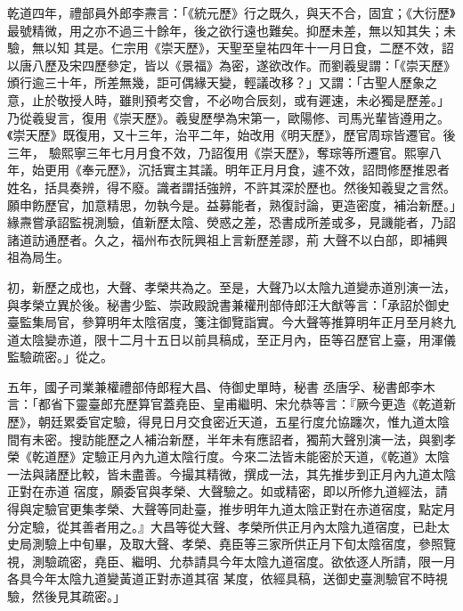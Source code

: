 
\begin{pinyinscope}

 乾道四年，禮部員外郎李燾言：「《統元歷》行之既久，與天不合，固宜；《大衍歷》最號精微，用之亦不過三十餘年，後之欲行遠也難矣。抑歷未差，無以知其失；未驗，無以知
 其是。仁宗用《崇天歷》，天聖至皇祐四年十一月日食，二歷不效，詔以唐八歷及宋四歷參定，皆以《景福》為密，遂欲改作。而劉羲叟謂：「《崇天歷》頒行逾三十年，所差無幾，詎可偶緣天變，輕議改移？」又謂：「古聖人歷象之意，止於敬授人時，雖則預考交會，不必吻合辰刻，或有遲速，未必獨是歷差。」乃從羲叟言，復用《崇天歷》。羲叟歷學為宋第一，歐陽修、司馬光輩皆遵用之。《崇天歷》既復用，又十三年，治平二年，始改用《明天歷》，歷官周琮皆遷官。後三年，
 驗熙寧三年七月月食不效，乃詔復用《崇天歷》，奪琮等所遷官。熙寧八年，始更用《奉元歷》，沉括實主其議。明年正月月食，遽不效，詔問修歷推恩者姓名，括具奏辨，得不廢。識者謂括強辨，不許其深於歷也。然後知羲叟之言然。願申飭歷官，加意精思，勿執今是。益募能者，熟復討論，更造密度，補治新歷。」緣燾嘗承詔監視測驗，值新歷太陰、熒惑之差，恐書成所差或多，見譏能者，乃詔諸道訪通歷者。久之，福州布衣阮興祖上言新歷差謬，荊
 大聲不以白部，即補興祖為局生。



 初，新歷之成也，大聲、孝榮共為之。至是，大聲乃以太陰九道變赤道別演一法，與孝榮立異於後。秘書少監、崇政殿說書兼權刑部侍郎汪大猷等言：「承詔於御史臺監集局官，參算明年太陰宿度，箋注御覽詣實。今大聲等推算明年正月至月終九道太陰變赤道，限十二月十五日以前具稿成，至正月內，臣等召歷官上臺，用渾儀監驗疏密。」從之。



 五年，國子司業兼權禮部侍郎程大昌、侍御史單時，秘書
 丞唐孚、秘書郎李木言：「都省下靈臺郎充歷算官蓋堯臣、皇甫繼明、宋允恭等言：『厥今更造《乾道新歷》，朝廷累委官定驗，得見日月交食密近天道，五星行度允協躔次，惟九道太陰間有未密。搜訪能歷之人補治新歷，半年未有應詔者，獨荊大聲別演一法，與劉孝榮《乾道歷》定驗正月內九道太陰行度。今來二法皆未能密於天道，《乾道》太陰一法與諸歷比較，皆未盡善。今撮其精微，撰成一法，其先推步到正月內九道太陰正對在赤道
 宿度，願委官與孝榮、大聲驗之。如或精密，即以所修九道經法，請得與定驗官更集孝榮、大聲等同赴臺，推步明年九道太陰正對在赤道宿度，點定月分定驗，從其善者用之。』大昌等從大聲、孝榮所供正月內太陰九道宿度，已赴太史局測驗上中旬畢，及取大聲、孝榮、堯臣等三家所供正月下旬太陰宿度，參照覽視，測驗疏密，堯臣、繼明、允恭請具今年太陰九道宿度。欲依逐人所請，限一月各具今年太陰九道變黃道正對赤道其宿
 某度，依經具稿，送御史臺測驗官不時視驗，然後見其疏密。」




\end{pinyinscope}
